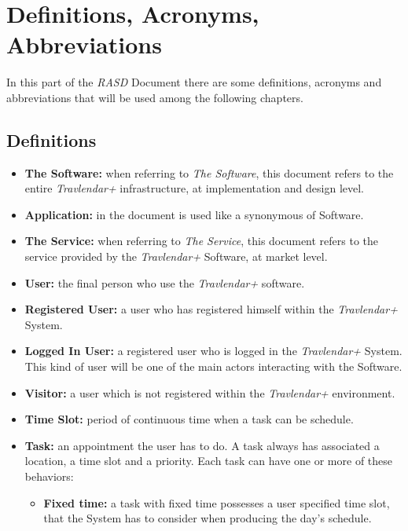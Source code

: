 \newpage
\section{Definitions, Acronyms, Abbreviations}

In this part of the \emph{RASD} Document there are some definitions, acronyms and abbreviations that will be used among the following chapters.

\subsection{Definitions}
\begin{itemize}
	\item \textbf{The Software:} when referring to \emph{The Software}, this document refers to the entire \emph{Travlendar+} infrastructure, at implementation and design level.
        
    \item \textbf{Application:} in the document is used like a synonymous of Software.
  
    \item \textbf{The Service:}  when referring to \emph{The Service}, this document refers to the service provided by the \emph{Travlendar+} Software, at market level.
      
    \item \textbf{User:} the final person who use the \emph{Travlendar+} software.
    
    \item \textbf{Registered User:} a user who has registered himself within the \emph{Travlendar+} System.
    
    \item \textbf{Logged In User:} a registered user who is logged in the \emph{Travlendar+} System. This kind of user will be one of the main actors interacting with the Software.
    
    \item \textbf{Visitor:} a user which is not registered within the \emph{Travlendar+} environment.
    
    \item \textbf{Time Slot:} period of continuous time when a task can be schedule.
    
	\item \textbf{Task:} an appointment the user has to do. A task always has associated a location, a time slot and a priority. Each task can have one or more of these behaviors:
    \begin{itemize}
        \item \textbf{Fixed time:} a task with fixed time possesses a user specified time slot, that the System has to consider when producing the day's schedule.


\end{itemize}
\end{itemize}

